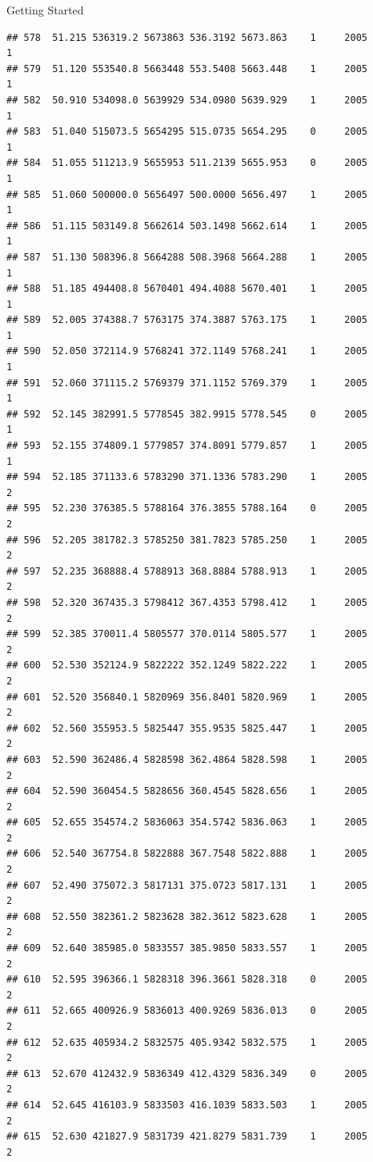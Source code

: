 \documentclass[
  ignorenonframetext,
]{beamer}
\begin{document}
\begin{frame}[fragile]{Getting Started}
\begin{verbatim}
## 578  51.215 536319.2 5673863 536.3192 5673.863    1     2005        1
## 579  51.120 553540.8 5663448 553.5408 5663.448    1     2005        1
## 582  50.910 534098.0 5639929 534.0980 5639.929    1     2005        1
## 583  51.040 515073.5 5654295 515.0735 5654.295    0     2005        1
## 584  51.055 511213.9 5655953 511.2139 5655.953    0     2005        1
## 585  51.060 500000.0 5656497 500.0000 5656.497    1     2005        1
## 586  51.115 503149.8 5662614 503.1498 5662.614    1     2005        1
## 587  51.130 508396.8 5664288 508.3968 5664.288    1     2005        1
## 588  51.185 494408.8 5670401 494.4088 5670.401    1     2005        1
## 589  52.005 374388.7 5763175 374.3887 5763.175    1     2005        1
## 590  52.050 372114.9 5768241 372.1149 5768.241    1     2005        1
## 591  52.060 371115.2 5769379 371.1152 5769.379    1     2005        1
## 592  52.145 382991.5 5778545 382.9915 5778.545    0     2005        1
## 593  52.155 374809.1 5779857 374.8091 5779.857    1     2005        1
## 594  52.185 371133.6 5783290 371.1336 5783.290    1     2005        2
## 595  52.230 376385.5 5788164 376.3855 5788.164    0     2005        2
## 596  52.205 381782.3 5785250 381.7823 5785.250    1     2005        2
## 597  52.235 368888.4 5788913 368.8884 5788.913    1     2005        2
## 598  52.320 367435.3 5798412 367.4353 5798.412    1     2005        2
## 599  52.385 370011.4 5805577 370.0114 5805.577    1     2005        2
## 600  52.530 352124.9 5822222 352.1249 5822.222    1     2005        2
## 601  52.520 356840.1 5820969 356.8401 5820.969    1     2005        2
## 602  52.560 355953.5 5825447 355.9535 5825.447    1     2005        2
## 603  52.590 362486.4 5828598 362.4864 5828.598    1     2005        2
## 604  52.590 360454.5 5828656 360.4545 5828.656    1     2005        2
## 605  52.655 354574.2 5836063 354.5742 5836.063    1     2005        2
## 606  52.540 367754.8 5822888 367.7548 5822.888    1     2005        2
## 607  52.490 375072.3 5817131 375.0723 5817.131    1     2005        2
## 608  52.550 382361.2 5823628 382.3612 5823.628    1     2005        2
## 609  52.640 385985.0 5833557 385.9850 5833.557    1     2005        2
## 610  52.595 396366.1 5828318 396.3661 5828.318    0     2005        2
## 611  52.665 400926.9 5836013 400.9269 5836.013    0     2005        2
## 612  52.635 405934.2 5832575 405.9342 5832.575    1     2005        2
## 613  52.670 412432.9 5836349 412.4329 5836.349    0     2005        2
## 614  52.645 416103.9 5833503 416.1039 5833.503    1     2005        2
## 615  52.630 421827.9 5831739 421.8279 5831.739    1     2005        2

\end{verbatim}
\end{frame}
\end{document}
